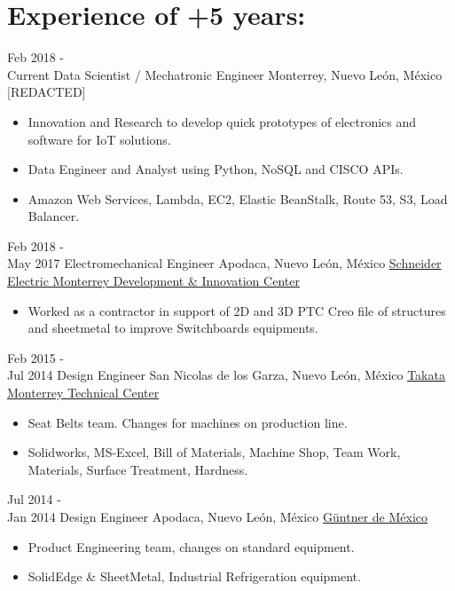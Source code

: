\documentclass[a4paper]{twentysecondcv} %
\begin{document}
\section{Experience of +5 years:}


\begin{twenty} %

\twentyitem
        {Feb 2018 - \\Current}
        {Data Scientist / Mechatronic Engineer}
        {Monterrey, Nuevo Le\'on, M\'exico}
        {{[REDACTED]}}
        {
        {
        \begin{itemize}
        \item Innovation and Research to develop quick prototypes of electronics and software for IoT solutions.
        \item Data Engineer and Analyst using Python, NoSQL and CISCO APIs.
        \item Amazon Web Services, Lambda, EC2, Elastic BeanStalk, Route 53, S3, Load Balancer.
        \end{itemize}
        }
        }

\twentyitem
        {Feb 2018 - \\May 2017}
        {Electromechanical Engineer}
        {Apodaca, Nuevo Le\'on, M\'exico}
        {\href{http://www.schneider-electric.com.mx}{Schneider Electric Monterrey Development \& Innovation Center}}
         {
        {
        \begin{itemize}
        \item Worked as a contractor in support of 2D and 3D PTC Creo file of structures and sheetmetal to improve Switchboards equipments.
        \end{itemize}
        }
        }
        
	\twentyitem
    	{Feb 2015 - \\Jul 2014}
        {Design Engineer}
        {San Nicolas de los Garza, Nuevo Le\'on, M\'exico}
        {\href{https://en.wikipedia.org/wiki/Takata_Corporation}{Takata Monterrey Technical Center}}
        {
        {\begin{itemize}
        \item Seat Belts team. Changes for machines on production line.
        \item Solidworks, MS-Excel, Bill of Materials, Machine Shop, Team Work, Materials, Surface Treatment, Hardness.
    \end{itemize}}
        }
        
    \twentyitem
   		{Jul 2014 - \\ Jan 2014}
        {Design Engineer}
        {Apodaca, Nuevo Le\'on,  M\'exico}
        {\href{http://www.guentner.com.mx/}{G\"{u}ntner de M\'exico}}
        {
        {
        \begin{itemize}
        \item Product Engineering team, changes on standard equipment.
        \item SolidEdge \& SheetMetal, Industrial Refrigeration equipment.
        \end{itemize}
        }
        }
        

\end{twenty}
\end{document}
